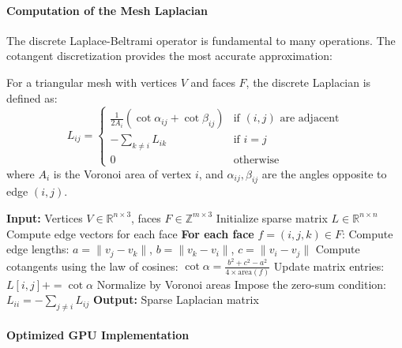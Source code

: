 \paragraph{Computation of the Mesh Laplacian}

The discrete Laplace-Beltrami operator is fundamental to many operations. The cotangent discretization provides the most accurate approximation:

\begin{definition}
For a triangular mesh with vertices $V$ and faces $F$, the discrete Laplacian is defined as:
\begin{equation}
L_{ij} = \begin{cases}
\frac{1}{2A_i}(\cot \alpha_{ij} + \cot \beta_{ij}) & \text{if } (i,j) \text{ are adjacent} \\
-\sum_{k \neq i} L_{ik} & \text{if } i = j \\
0 & \text{otherwise}
\end{cases}
\end{equation}
where $A_i$ is the Voronoi area of vertex $i$, and $\alpha_{ij}, \beta_{ij}$ are the angles opposite to edge $(i,j)$.
\end{definition}

\begin{algorithm}[H]
\caption{Efficient Construction of the Mesh Laplacian}
\begin{algorithmic}[1]
    \State \textbf{Input:} Vertices $V \in \mathbb{R}^{n \times 3}$, faces $F \in \mathbb{Z}^{m \times 3}$
    \State Initialize sparse matrix $L \in \mathbb{R}^{n \times n}$
    \State Compute edge vectors for each face
    \State \textbf{For each face} $f = (i, j, k) \in F$:
    \State \quad Compute edge lengths: $a = \|v_j - v_k\|$, $b = \|v_k - v_i\|$, $c = \|v_i - v_j\|$
    \State \quad Compute cotangents using the law of cosines:
    \State \quad \quad $\cot \alpha = \frac{b^2 + c^2 - a^2}{4 \times \text{area}(f)}$
    \State \quad Update matrix entries: $L[i,j] += \cot \alpha$
    \State Normalize by Voronoi areas
    \State Impose the zero-sum condition: $L_{ii} = -\sum_{j \neq i} L_{ij}$
    \State \textbf{Output:} Sparse Laplacian matrix
\end{algorithmic}
\end{algorithm}

\paragraph{Optimized GPU Implementation}

